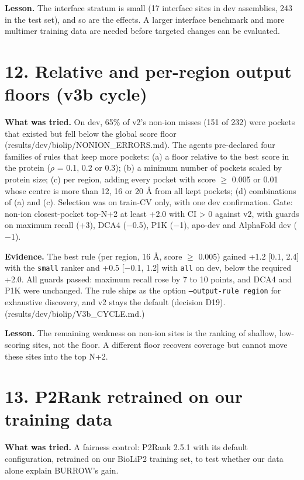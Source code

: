 \documentclass[10pt,letterpaper]{article}
\begin{document}
\textbf{Lesson.} The interface stratum is small (17 interface sites in dev assemblies, 243 in the test set), and so are the effects. A larger interface benchmark and more multimer training data are needed before targeted changes can be evaluated.

\section*{12. Relative and per-region output floors (v3b cycle)}

\textbf{What was tried.} On dev, 65\% of v2's non-ion misses (151 of 232) were pockets that existed but fell below the global score floor (results/dev/biolip/NONION\_ERRORS.md). The agents pre-declared four families of rules that keep more pockets: (a) a floor relative to the best score in the protein ($\rho$ = 0.1, 0.2 or 0.3); (b) a minimum number of pockets scaled by protein size; (c) per region, adding every pocket with score $\ge$ 0.005 or 0.01 whose centre is more than 12, 16 or 20 \AA{} from all kept pockets; (d) combinations of (a) and (c). Selection was on train-CV only, with one dev confirmation. Gate: non-ion closest-pocket top-N+2 at least +2.0 with CI \textgreater{} 0 against v2, with guards on maximum recall (+3), DCA4 ($-$0.5), P1K ($-$1), apo-dev and AlphaFold dev ($-$1).

\textbf{Evidence.} The best rule (per region, 16 \AA{}, score $\ge$ 0.005) gained +1.2 [0.1, 2.4] with the \texttt{small} ranker and +0.5 [$-$0.1, 1.2] with \texttt{all} on dev, below the required +2.0. All guards passed: maximum recall rose by 7 to 10 points, and DCA4 and P1K were unchanged. The rule ships as the option \texttt{--output-rule region} for exhaustive discovery, and v2 stays the default (decision D19). (results/dev/biolip/V3b\_CYCLE.md.)

\textbf{Lesson.} The remaining weakness on non-ion sites is the ranking of shallow, low-scoring sites, not the floor. A different floor recovers coverage but cannot move these sites into the top N+2.

\section*{13. P2Rank retrained on our training data}

\textbf{What was tried.} A fairness control: P2Rank 2.5.1 with its default configuration, retrained on our BioLiP2 training set, to test whether our data alone explain BURROW's gain.
\end{document}
